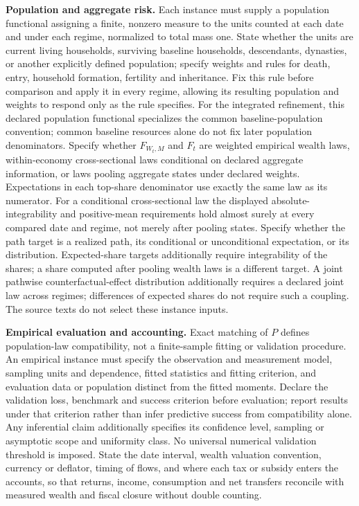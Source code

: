 \documentclass[11pt,a4paper]{article}
\begin{document}
\textbf{Population and aggregate risk.} Each instance must supply a population functional assigning a finite, nonzero measure to the units counted at each date and under each regime, normalized to total mass one. State whether the units are current living households, surviving baseline households, descendants, dynasties, or another explicitly defined population; specify weights and rules for death, entry, household formation, fertility and inheritance. Fix this rule before comparison and apply it in every regime, allowing its resulting population and weights to respond only as the rule specifies. For the integrated refinement, this declared population functional specializes the common baseline-population convention; common baseline resources alone do not fix later population denominators. Specify whether \(F_{W_t,M}\) and \(F_t\) are weighted empirical wealth laws, within-economy cross-sectional laws conditional on declared aggregate information, or laws pooling aggregate states under declared weights. Expectations in each top-share denominator use exactly the same law as its numerator. For a conditional cross-sectional law the displayed absolute-integrability and positive-mean requirements hold almost surely at every compared date and regime, not merely after pooling states. Specify whether the path target is a realized path, its conditional or unconditional expectation, or its distribution. Expected-share targets additionally require integrability of the shares; a share computed after pooling wealth laws is a different target. A joint pathwise counterfactual-effect distribution additionally requires a declared joint law across regimes; differences of expected shares do not require such a coupling. The source texts do not select these instance inputs.

\textbf{Empirical evaluation and accounting.} Exact matching of \(P\) defines population-law compatibility, not a finite-sample fitting or validation procedure. An empirical instance must specify the observation and measurement model, sampling units and dependence, fitted statistics and fitting criterion, and evaluation data or population distinct from the fitted moments. Declare the validation loss, benchmark and success criterion before evaluation; report results under that criterion rather than infer predictive success from compatibility alone. Any inferential claim additionally specifies its confidence level, sampling or asymptotic scope and uniformity class. No universal numerical validation threshold is imposed. State the date interval, wealth valuation convention, currency or deflator, timing of flows, and where each tax or subsidy enters the accounts, so that returns, income, consumption and net transfers reconcile with measured wealth and fiscal closure without double counting.
\end{document}

